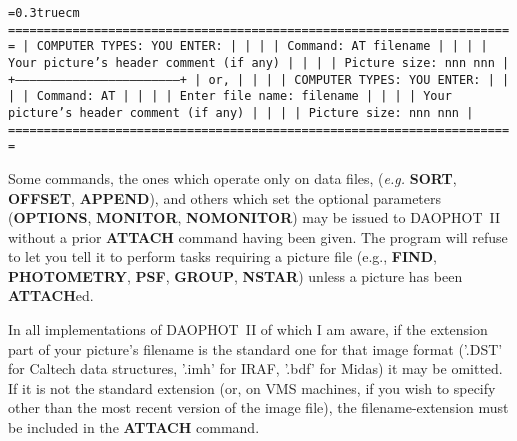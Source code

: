 \bigskip
{\noindent\obeylines\obeyspaces\frenchspacing\tt\baselineskip=0.3truecm
=======================================================================
| COMPUTER TYPES:                                      YOU ENTER:     |
|                                                                     |
| Command:                                             AT filename    |
|                                                                     |
|       Your picture's header comment (if any)                        |
|                                                                     |
|                   Picture size:   nnn  nnn                          |
+---------------------------------------------------------------------+
| or,                                                                 |
|                                                                     |
| COMPUTER TYPES:                                      YOU ENTER:     |
|                                                                     |
| Command:                                             AT             |
|                                                                     |
|                Enter file name:                      filename       |
|                                                                     |
|       Your picture's header comment (if any)                        |
|                                                                     |
|                   Picture size:   nnn  nnn                          |
=======================================================================
}
\bigskip

\noindent Some commands, the ones which operate only on data files,
({\it e.g.} {\bf SORT}, {\bf OFFSET}, {\bf APPEND}), and others which
set the optional parameters ({\bf OPTIONS}, {\bf MONITOR}, {\bf
NOMONITOR}) may be issued to DAOPHOT~II without a prior {\bf ATTACH}
command having been given.  The program will refuse to let you tell it
to perform tasks requiring a picture file (e.g., {\bf FIND}, {\bf
PHOTOMETRY}, {\bf PSF}, {\bf GROUP}, {\bf NSTAR}) unless a picture has
been {\bf ATTACH}ed. 

In all implementations of DAOPHOT~II of which I am aware, if the
extension part of your picture's filename is the standard one for that
image format ('.DST' for Caltech data structures, '.imh' for IRAF,
'.bdf' for Midas) it may be omitted.  If it is not the standard
extension (or, on VMS machines, if you wish to specify other than the
most recent version of the image file), the filename-extension must be
included in the {\bf ATTACH} command.

